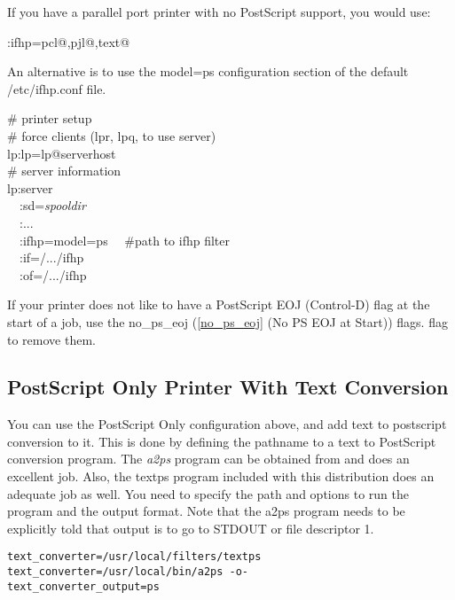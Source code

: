 \documentclass[a4paper]{article}
\begin{document}
If you have a parallel port printer with no PostScript support,
you would use:
\begin{tscreen}
:ifhp=pcl@,pjl@,text@
\end{tscreen}


An alternative is to use the
{\ttfamily model=ps}
configuration section of the default
{\ttfamily /etc/ifhp.conf} file.
\begin{tscreen}
\# printer setup  \\ 
\#  force clients (lpr, lpq, to use server)  \\ 
lp:lp=lp@serverhost  \\ 
\# server information  \\ 
lp:server  \\ 
~~:sd={\itshape spooldir\/}  \\ 
~~:...  \\ 
~~:ifhp=model=ps
~~\#path to ifhp filter  \\ 
~~:if=/.../ifhp  \\ 
~~:of=/.../ifhp  
\end{tscreen}


If your printer does not like to have a PostScript EOJ (Control-D)
flag at the start of a job,
use the
{\ttfamily no\_ps\_eoj}
(\ref{no_ps_eoj} {(No PS EOJ at Start)}) flags.
flag to remove them.


\subsection{PostScript Only Printer With Text Conversion}

You can use the PostScript Only configuration above,
and add text to postscript conversion to it.
This is done by defining the pathname to a text to PostScript
conversion program.
The
{\itshape a2ps\/}
program can be obtained from
and does an excellent job.
Also,
the
{\ttfamily textps}
program included with this distribution does an adequate job as well.
You need to specify the path and options to run
the program and the output format.
Note that the
{\ttfamily a2ps} program needs to be explicitly told that output
is to go to
{\ttfamily STDOUT} or file descriptor 1.
\begin{tscreen}
\begin{verbatim}
text_converter=/usr/local/filters/textps
text_converter=/usr/local/bin/a2ps -o-
text_converter_output=ps
\end{verbatim}
\end{tscreen}
\end{document}
